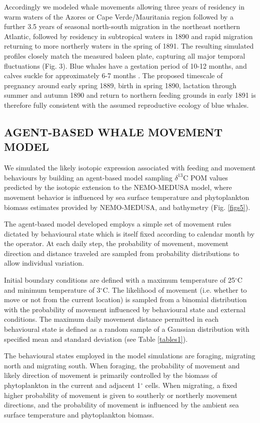 \documentclass[a4paper,12pt]{article}
\begin{document}
Accordingly we modeled whale movements allowing three years of residency in warm waters of the Azores or Cape Verde/Mauritania region followed by a further 3.5 years of seasonal north-south migration in the northeast northern Atlantic, followed by residency in subtropical waters in 1890 and rapid migration returning to more northerly waters in the spring of 1891. 
The resulting simulated profiles closely match the measured baleen plate, capturing all major temporal fluctuations (Fig. 3). 
Blue whales have a gestation period of 10-12 months, and calves suckle for approximately 6-7 months \cite{handbook}. 
The proposed timescale of pregnancy around early spring 1889, birth in spring 1890, lactation through summer and autumn 1890 and return to northern feeding grounds in early 1891 is therefore fully consistent with the assumed reproductive ecology of blue whales.

\subsection*{AGENT-BASED WHALE MOVEMENT MODEL}
We simulated the likely isotopic expression associated with feeding and movement behaviours by building an agent-based model sampling $\delta^{13}$C POM values predicted by the isotopic extension to the NEMO-MEDUSA model\cite{magozzi2017using,yool2013medusa}, where movement behavior is influenced by sea surface temperature and phytoplankton biomass estimates provided by NEMO-MEDUSA\cite{yool2013medusa}, and bathymetry (Fig. \ref{figs5}).
 
The agent-based model developed employs a simple set of movement rules dictated by behavioural state which is itself fixed according to calendar month by the operator. 
At each daily step, the probability of movement, movement direction and distance traveled are sampled from probability distributions to allow individual variation.

Initial boundary conditions are defined with a maximum temperature of 25$^{\circ}$C and minimum temperature of 3$^{\circ}$C. 
The likelihood of movement (i.e. whether to move or not from the current location) is sampled from a binomial distribution with the probability of movement influenced by behavioural state and external conditions. 
The maximum daily movement distance permitted in each behavioural state is defined as a random sample of a Gaussian distribution with specified mean and standard deviation (see Table \ref{tables1}).
 
The behavioural states employed in the model simulations are foraging, migrating north and migrating south. 
When foraging, the probability of movement and likely direction of movement is primarily controlled by the biomass of phytoplankton in the current and adjacent 1$^{\circ}$ cells. 
When migrating, a fixed higher probability of movement is given to southerly or northerly movement directions, and the probability of movement is influenced by the ambient sea surface temperature and phytoplankton biomass.
 
\end{document}

